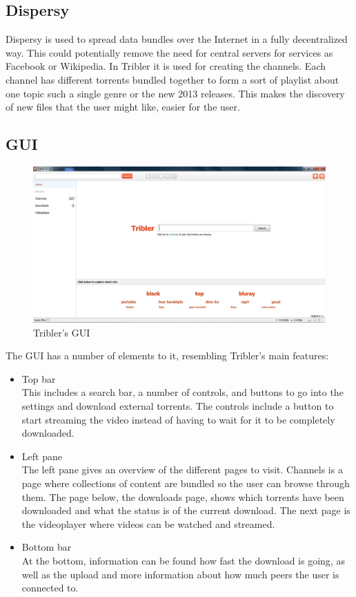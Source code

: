 \subsection{Dispersy}
Dispersy is used to spread data bundles over the Internet in a fully decentralized way. This could potentially remove the need for central servers for services as Facebook or Wikipedia. In Tribler it is used for creating the channels. Each channel has different torrents bundled together to form a sort of playlist about one topic such a single genre or the new 2013 releases. This makes the discovery of new files that the user might like, easier for the user.

\subsection{GUI}
\begin{figure}[h]
	\centering
	\includegraphics[scale=0.35]{vod/images/tribler_gui.jpg}
	\caption{Tribler's GUI}
\end{figure}
The GUI has a number of elements to it, resembling Tribler's main features:
 \begin{itemize}
	\item Top bar\\ This includes a search bar, a number of controls, and buttons to go into the settings and download external torrents. The controls include a button to start streaming the video instead of having to wait for it to be completely downloaded.
	\item Left pane\\ The left pane gives an overview of the different pages to visit. Channels is a page where collections of content are bundled so the user can browse through them. The page below, the downloads page, shows which torrents have been downloaded and what the status is of the current download. The next page is the videoplayer where videos can be watched and streamed.
	\item Bottom bar\\ At the bottom, information can be found how fast the download is going, as well as the upload and more information about how much peers the user is connected to.
\end{itemize}

